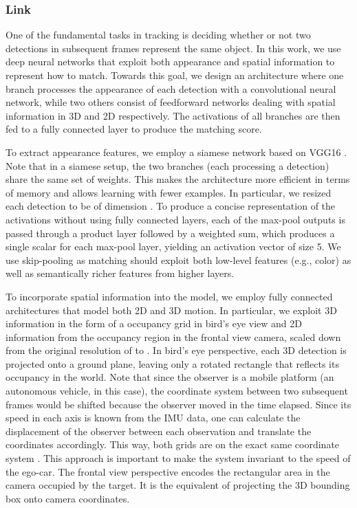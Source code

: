 \documentclass[letterpaper, 10 pt, conference]{ieeeconf}  \pdfminorversion=4
\newcommand{\raquel}[1]{}
\begin{document}
\subsubsection{\textbf{Link }}
\label{sec:matching_network}

One of the fundamental tasks in tracking is deciding whether or not two detections in
subsequent frames represent the same object. In this work, we use deep neural networks that exploit both appearance and spatial information to represent how to match. Towards this goal, we design an architecture where one branch processes the appearance of each detection with a convolutional neural network, while two others consist of feedforward networks dealing with spatial information in 3D and 2D respectively. The activations of all branches are then fed to a fully connected layer to produce the matching score.

To extract appearance features, we employ a siamese  network based on VGG16 \cite{vgg16}. Note that in a siamese setup, the two branches (each processing a detection)   share the same set of weights. This makes the architecture more efficient  in terms of memory and allows learning with fewer examples. In particular, we resized each detection to be of dimension . To produce a concise representation of the activations without using fully connected layers, each of the max-pool outputs is passed through a product layer followed by a weighted sum, which produces a single scalar for each max-pool layer, yielding an activation vector of size 5. We use skip-pooling as matching should exploit both low-level features (e.g., color) as well as semantically richer features from higher layers.


To incorporate spatial information into the model, we employ fully connected architectures that model both 2D and 3D motion. In particular, we exploit 3D information in the form of  a  occupancy grid in bird's eye view and 2D information from the occupancy region in the frontal view camera, scaled down from the original resolution of  to . In bird's eye perspective, each 3D detection is projected onto a ground plane, leaving only a rotated rectangle that reflects its occupancy in the world. Note that since the observer is a mobile platform (an autonomous vehicle, in this case), the coordinate system between two subsequent frames would be  shifted because the observer moved in the time elapsed. Since its speed in each axis is known from the IMU data, one can calculate the displacement of the observer between each observation and translate the coordinates accordingly. This way, both grids are on the exact same coordinate system \raquel{world coordinate system that is static?}. This approach is important to make the system invariant to the speed of the ego-car. The frontal view perspective encodes the rectangular area in the camera occupied by the target. It is the equivalent of projecting the 3D bounding box onto camera coordinates.
\end{document}

